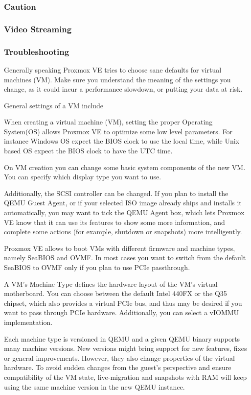 \subsubsection{Caution}

\subsubsection{Video Streaming}

\subsubsection{Troubleshooting}

Generally speaking Proxmox VE tries to choose sane defaults for virtual machines (VM). Make sure you understand the meaning of the settings you change, as it could incur a performance slowdown, or putting your data at risk.

General settings of a VM include

When creating a virtual machine (VM), setting the proper Operating System(OS) allows Proxmox VE to optimize some low level parameters. For instance Windows OS expect the BIOS clock to use the local time, while Unix based OS expect the BIOS clock to have the UTC time.

On VM creation you can change some basic system components of the new VM. You can specify which display type you want to use.

Additionally, the SCSI controller can be changed. If you plan to install the QEMU Guest Agent, or if your selected ISO image already ships and installs it automatically, you may want to tick the QEMU Agent box, which lets Proxmox VE know that it can use its features to show some more information, and complete some actions (for example, shutdown or snapshots) more intelligently.

Proxmox VE allows to boot VMs with different firmware and machine types, namely SeaBIOS and OVMF. In most cases you want to switch from the default SeaBIOS to OVMF only if you plan to use PCIe passthrough.

A VM’s Machine Type defines the hardware layout of the VM’s virtual motherboard. You can choose between the default Intel 440FX or the Q35 chipset, which also provides a virtual PCIe bus, and thus may be desired if you want to pass through PCIe hardware. Additionally, you can select a vIOMMU implementation.

Each machine type is versioned in QEMU and a given QEMU binary supports many machine versions. New versions might bring support for new features, fixes or general improvements. However, they also change properties of the virtual hardware. To avoid sudden changes from the guest’s perspective and ensure compatibility of the VM state, live-migration and snapshots with RAM will keep using the same machine version in the new QEMU instance.

